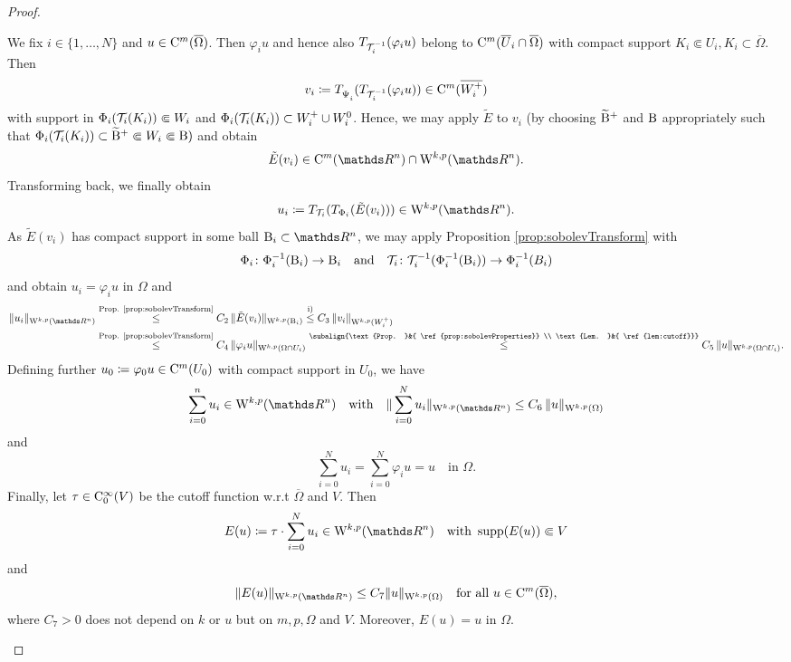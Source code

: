 \begin{proof}
\begin{enumerate}[i)]
      We fix $i \in \{1,\dots,N\}$ and $u \in \mathrm{C}^m(\overline\Omega)$.
      Then $\varphi_i u$ and hence also $T_{\mathcal{T}_i^{-1}}(\varphi_i u)$ belong to $\mathrm{C}^m(\overline U_i \cap \overline\Omega)$ with compact support $K_i \Subset U_i, K_i \subset \overline\Omega$.
      Then
      $$
      v_i \coloneqq T_{\vphantom{\Tau_i^{-1}}{\Psi_i^{\vphantom{-1}}}}(T_{\Tau_i^{-1}}(\varphi_i u)) \in \CC^m(\overline{W_i^+})
      $$
      with support in $\Phi_i(\mathcal{T}_i(K_i)) \Subset W_i$ and $\Phi_i(\mathcal{T}_i(K_i)) \subset W_i^+ \cup W_i^0$.
      Hence, we may apply $\tilde E$ to $v_i$ (by choosing $\widetilde {\mathrm{B}}^+$ and $\mathrm{B}$ appropriately such that $\Phi_i(\mathcal{T}_i(K_i)) \subset \widetilde {\mathrm{B}}^+ \Subset W_i \Subset \mathrm{B})$ and obtain
      $$
      \tilde E(v_i)  \in \CC^m(\R^n) \cap \WW^{k,p}(\R^n).
      $$
      Transforming back, we finally obtain
      $$
      u_i \coloneqq T_{\Tau_i} ( T_{\Phi_i}( \tilde E(v_i))) \in \WW^{k,p}(\R^n).
      $$
      As $\tilde E(v_i)$ has compact support in some ball $\BB_i \subset \R^n$, we may apply Proposition \ref{prop:sobolevTransform} with 
      $$
      \Phi_i \colon \Phi_i^{-1}(\mathrm{B}_i) \to \mathrm{B}_i \quad\text{and}\quad
      \mathcal{T}_i \colon \mathcal{T}_i^{-1}(\Phi_i^{-1}(\mathrm{B}_i)) \to \Phi_i^{-1}(B_i)
      $$
      and obtain $u_i = \varphi_i u$ in $\Omega$ and 
      \begin{align*}
        \|u_i\|_{\WW^{k,p}(\R^n)}
        &\overset{\text{Prop. \ref{prop:sobolevTransform}}}{\leq} C_2 \, \| \tilde E(v_i) \|_{\WW^{k,p}(\BB_i)}
        \overset{\mathrm i)}{\leq} C_3 \, \| v_i \|_{\WW^{k,p}(W_i^+)} \\
        &\overset{\text{Prop. \ref{prop:sobolevTransform}}}{\leq} C_4 \, \|\varphi_i u\|_{\WW^{k,p}(\Omega \cap U_i)}  
        \overset{\subalign{\text{Prop. }&{ \ref{prop:sobolevProperties}} \\ \text{Lem. }&{ \ref{lem:cutoff}}}}{\leq} C_5 \, \|u\|_{\WW^{k,p}(\Omega \cap U_i)}.
      \end{align*}
      Defining further $u_0 \coloneqq \varphi_0 u \in \mathrm{C}^m(U_0)$ with compact support in $U_0$, we have 
      $$
        \sum_{i = 0}^n u_i \in \WW^{k,p}(\R^n) \quad\text{with}\quad \| \sum_{i = 0}^N u_i \|_{\WW^{k,p}(\R^n)} \leq C_6 \, \|u\|_{\WW^{k,p}(\Omega)} 
        $$
        and
        $$
        \sum_{i = 0}^N u_i = \sum_{i = 0}^N \varphi_i u = u \quad\text{in }\Omega.
        $$
        Finally, let $\tau \in \mathrm{C}_0^\infty(V)$ be the cutoff function w.r.t $\overline \Omega$ and $V$. Then
        $$
        E(u) \coloneqq \tau \cdot \sum_{i = 0}^N u_i \in \WW^{k,p}(\R^n) \quad\text{with } \supp (E(u)) \Subset V
        $$
        and
        \begin{equation}
          \label{eq:continuousExtension}
          \|E(u)\|_{\WW^{k,p}(\R^n)} \leq C_7 \|u \|_{\WW^{k,p}(\Omega)} \quad\text{for all } u \in \CC^m(\overline\Omega),
        \end{equation}
        where $C_7 > 0$ does not depend on $k$ or $u$ but on $m,p,\Omega$ and $V$.
        Moreover, $E(u) = u$ in $\Omega$.


\end{enumerate}
\end{proof}
